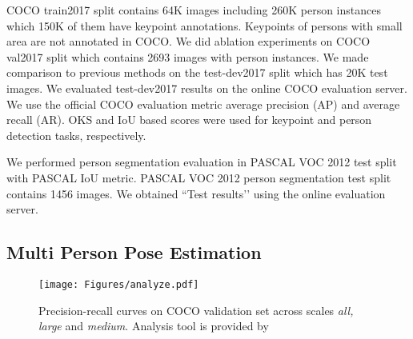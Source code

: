\documentclass[runningheads]{llncs}
\begin{document}
COCO train2017 split contains 64K images including 260K person instances which 150K of them have keypoint annotations. Keypoints of persons with small area are not annotated in COCO. We did ablation experiments on COCO val2017 split which contains 2693 images with person instances. We made comparison to previous methods on the test-dev2017 split which has 20K test images. We evaluated test-dev2017 results on the online COCO evaluation server. We use the official COCO evaluation metric average precision (AP) and average recall (AR). OKS and IoU based scores were used for keypoint and person detection tasks, respectively.


We performed person segmentation evaluation in PASCAL VOC 2012 test split with PASCAL IoU metric. PASCAL VOC 2012 person segmentation test split contains 1456 images. We obtained ``Test results’’ using the online evaluation server.
\subsection{Multi Person Pose Estimation}
\begin{figure}
\centering
\texttt{[image: Figures/analyze.pdf]}
\caption{Precision-recall curves on COCO validation set across scales \textit{all, large} and \textit{medium}. Analysis tool is provided by \cite{Ronchi2017}}
\label{fig:analyze}
\end{figure} 
\end{document}
